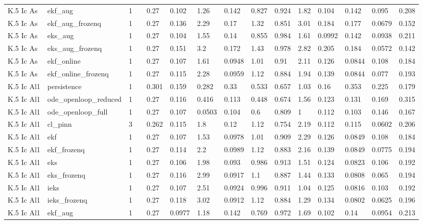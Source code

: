 \begin{table}[t]
\begin{tabular}{lllllllllllllll}
K.5 Ic As & ekf\_aug & 1 &  & 0.27 & 0.102 & 1.26 & 0.142 & 0.827 & 0.924 & 1.82 & 0.104 & 0.142 & 0.095 & 0.208 \\
K.5 Ic As & ekf\_aug\_frozenq & 1 &  & 0.27 & 0.136 & 2.29 & 0.17 & 1.32 & 0.851 & 3.01 & 0.184 & 0.177 & 0.0679 & 0.152 \\
K.5 Ic As & eks\_aug & 1 &  & 0.27 & 0.104 & 1.55 & 0.14 & 0.855 & 0.984 & 1.61 & 0.0992 & 0.142 & 0.0938 & 0.211 \\
K.5 Ic As & eks\_aug\_frozenq & 1 &  & 0.27 & 0.151 & 3.2 & 0.172 & 1.43 & 0.978 & 2.82 & 0.205 & 0.184 & 0.0572 & 0.142 \\
K.5 Ic As & ekf\_online & 1 &  & 0.27 & 0.107 & 1.61 & 0.0948 & 1.01 & 0.91 & 2.11 & 0.126 & 0.0844 & 0.108 & 0.184 \\
K.5 Ic As & ekf\_online\_frozenq & 1 &  & 0.27 & 0.115 & 2.28 & 0.0959 & 1.12 & 0.884 & 1.94 & 0.139 & 0.0844 & 0.077 & 0.193 \\
K.5 Ic Al1 & persistence & 1 &  & 0.301 & 0.159 & 0.282 & 0.33 & 0.533 & 0.657 & 1.03 & 0.16 & 0.353 & 0.225 & 0.179 \\
K.5 Ic Al1 & ode\_openloop\_reduced & 1 &  & 0.27 & 0.116 & 0.416 & 0.113 & 0.448 & 0.674 & 1.56 & 0.123 & 0.131 & 0.169 & 0.315 \\
K.5 Ic Al1 & ode\_openloop\_full & 1 &  & 0.27 & 0.107 & 0.0503 & 0.104 & 0.6 & 0.809 & 1 & 0.112 & 0.103 & 0.146 & 0.167 \\
K.5 Ic Al1 & cl\_pinn & 3 &  & 0.262 & 0.115 & 1.8 & 0.12 & 1.12 & 0.754 & 2.19 & 0.112 & 0.115 & 0.0602 & 0.206 \\
K.5 Ic Al1 & ekf & 1 &  & 0.27 & 0.107 & 1.53 & 0.0978 & 1.01 & 0.909 & 2.29 & 0.126 & 0.0849 & 0.108 & 0.184 \\
K.5 Ic Al1 & ekf\_frozenq & 1 &  & 0.27 & 0.114 & 2.2 & 0.0989 & 1.12 & 0.883 & 2.16 & 0.139 & 0.0849 & 0.0775 & 0.194 \\
K.5 Ic Al1 & eks & 1 &  & 0.27 & 0.106 & 1.98 & 0.093 & 0.986 & 0.913 & 1.51 & 0.124 & 0.0823 & 0.106 & 0.192 \\
K.5 Ic Al1 & eks\_frozenq & 1 &  & 0.27 & 0.116 & 2.99 & 0.0917 & 1.1 & 0.887 & 1.44 & 0.133 & 0.0808 & 0.065 & 0.194 \\
K.5 Ic Al1 & ieks & 1 &  & 0.27 & 0.107 & 2.51 & 0.0924 & 0.996 & 0.911 & 1.04 & 0.125 & 0.0816 & 0.103 & 0.192 \\
K.5 Ic Al1 & ieks\_frozenq & 1 &  & 0.27 & 0.118 & 3.02 & 0.0912 & 1.12 & 0.884 & 1.29 & 0.134 & 0.0802 & 0.0625 & 0.196 \\
K.5 Ic Al1 & ekf\_aug & 1 &  & 0.27 & 0.0977 & 1.18 & 0.142 & 0.769 & 0.972 & 1.69 & 0.102 & 0.14 & 0.0954 & 0.213 \\

\end{tabular}
\end{table}
